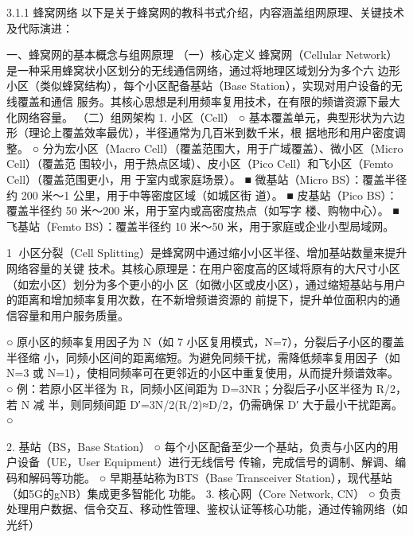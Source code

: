 
3.1.1 蜂窝网络
以下是关于蜂窝网的教科书式介绍，内容涵盖组网原理、关键技术及代际演进：


一、蜂窝网的基本概念与组网原理
（一）核心定义
蜂窝网（Cellular Network）是一种采用蜂窝状小区划分的无线通信网络，通过将地理区域划分为多个六
边形小区（类似蜂窝结构），每个小区配备基站（Base Station），实现对用户设备的无线覆盖和通信
服务。其核心思想是利用频率复用技术，在有限的频谱资源下最大化网络容量。
（二）组网架构
1.   小区（Cell）
      ○ 基本覆盖单元，典型形状为六边形（理论上覆盖效率最优），半径通常为几百米到数千米，根
        据地形和用户密度调整。
      ○ 分为宏小区（Macro Cell）（覆盖范围大，用于广域覆盖）、微小区（Micro Cell）（覆盖范
        围较小，用于热点区域）、皮小区（Pico Cell）和飞小区（Femto Cell）（覆盖范围更小，用
        于室内或家庭场景）。
        ■ 微基站（Micro BS）：覆盖半径约 200 米～1 公里，用于中等密度区域（如城区街
          道）。
        ■ 皮基站（Pico BS）：覆盖半径约 50 米～200 米，用于室内或高密度热点（如写字
          楼、购物中心）。
        ■ 飞基站（Femto BS）：覆盖半径约 10 米～50 米，用于家庭或企业小型局域网。




                                                          1
小区分裂（Cell Splitting）是蜂窝网中通过缩小小区半径、增加基站数量来提升网络容量的关键
技术。其核心原理是：在用户密度高的区域将原有的大尺寸小区（如宏小区）划分为多个更小的小
区（如微小区或皮小区），通过缩短基站与用户的距离和增加频率复用次数，在不新增频谱资源的
前提下，提升单位面积内的通信容量和用户服务质量。




     ○ 原小区的频率复用因子为 N（如 7 小区复用模式，N=7），分裂后子小区的覆盖半径缩
       小，同频小区间的距离缩短。为避免同频干扰，需降低频率复用因子（如 N=3 或
       N=1），使相同频率可在更邻近的小区中重复使用，从而提升频谱效率。
     ○ 例：若原小区半径为 R，同频小区间距为 D=3NR；分裂后子小区半径为 R/2，若 N 减
       半，则同频间距 D′=3N/2(R/2)≈D/2，仍需确保 D′ 大于最小干扰距离。
     ○

2. 基站（BS，Base Station）
    ○ 每个小区配备至少一个基站，负责与小区内的用户设备（UE，User Equipment）进行无线信号
      传输，完成信号的调制、解调、编码和解码等功能。
    ○ 早期基站称为BTS（Base Transceiver Station），现代基站（如5G的gNB）集成更多智能化
      功能。
3. 核心网（Core Network, CN）
    ○ 负责处理用户数据、信令交互、移动性管理、鉴权认证等核心功能，通过传输网络（如光纤）



